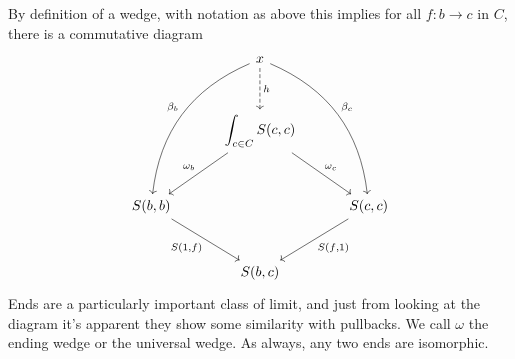 By definition of a wedge, with notation as above this implies for all $f: b \to c$ in $C$, there is a commutative diagram
\[\begin{tikzcd}[row sep = 3em, column sep = 3em]
 & x \ar[" \beta_c ", bend left, ddr] \ar[" \beta_b "', bend right, ddl] \ar[" h ", dashed, d]  &  \\
 & \displaystyle{\int_{c\in C} S(c,c)} \ar[" \omega_c ", dr] \ar[" \omega_b "', dl]  &  \\
S(b,b)\ar[" S(1\text{,}f) "', dr]  &  & S(c,c)\ar[" S(f\text{,} 1) ", dl]  \\
 & S(b,c) & 
\end{tikzcd}\]
Ends are a particularly important class of limit, and just from looking at the diagram it's apparent they show some similarity with pullbacks. We call $\omega$ the ending wedge or the universal wedge. As always, any two ends are isomorphic.

